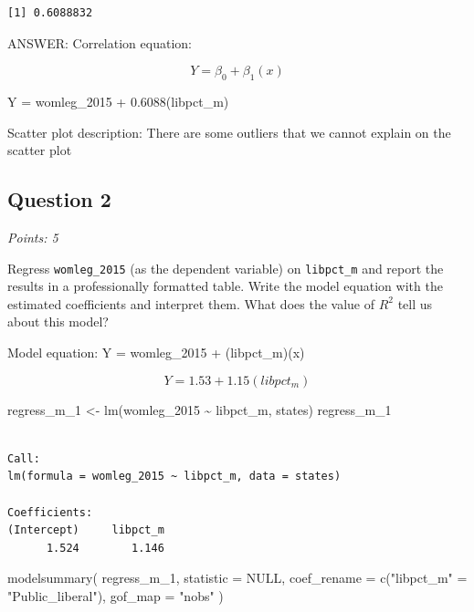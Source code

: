 \documentclass[
  letterpaper,
  DIV=11,
  numbers=noendperiod]{scrartcl}
\newenvironment{Shaded}{\begin{snugshade}}{\end{snugshade}}
\newcommand{\AttributeTok}[1]{\textcolor[rgb]{0.40,0.45,0.13}{#1}}
\newcommand{\ConstantTok}[1]{\textcolor[rgb]{0.56,0.35,0.01}{#1}}
\newcommand{\FunctionTok}[1]{\textcolor[rgb]{0.28,0.35,0.67}{#1}}
\newcommand{\NormalTok}[1]{\textcolor[rgb]{0.00,0.23,0.31}{#1}}
\newcommand{\OtherTok}[1]{\textcolor[rgb]{0.00,0.23,0.31}{#1}}
\newcommand{\SpecialCharTok}[1]{\textcolor[rgb]{0.37,0.37,0.37}{#1}}
\newcommand{\StringTok}[1]{\textcolor[rgb]{0.13,0.47,0.30}{#1}}
\begin{document}
\begin{Shaded}
\end{Shaded}

\begin{verbatim}
[1] 0.6088832
\end{verbatim}

ANSWER: Correlation equation:

\[Y= \beta_0+\beta_1(x)\]

Y = womleg\_2015 + 0.6088(libpct\_m)

Scatter plot description: There are some outliers that we cannot explain
on the scatter plot

\hypertarget{question-2}{%
\subsection{Question 2}\label{question-2}}

\emph{Points: 5}

Regress \texttt{womleg\_2015} (as the dependent variable) on
\texttt{libpct\_m} and report the results in a professionally formatted
table. Write the model equation with the estimated coefficients and
interpret them. What does the value of \(R^2\) tell us about this model?

Model equation: Y = womleg\_2015 + (libpct\_m)(x)

\[Y = 1.53 + 1.15(libpct_m)\]

\begin{Shaded}
\begin{Highlighting}[]
\NormalTok{regress\_m\_1 }\OtherTok{\textless{}{-}} \FunctionTok{lm}\NormalTok{(womleg\_2015 }\SpecialCharTok{\textasciitilde{}}\NormalTok{ libpct\_m, states)}
\NormalTok{regress\_m\_1}
\end{Highlighting}
\end{Shaded}

\begin{verbatim}

Call:
lm(formula = womleg_2015 ~ libpct_m, data = states)

Coefficients:
(Intercept)     libpct_m  
      1.524        1.146  
\end{verbatim}

\begin{Shaded}
\begin{Highlighting}[]
\FunctionTok{modelsummary}\NormalTok{(}
\NormalTok{  regress\_m\_1, }
  \AttributeTok{statistic =} \ConstantTok{NULL}\NormalTok{,}
  \AttributeTok{coef\_rename =} \FunctionTok{c}\NormalTok{(}\StringTok{"libpct\_m"} \OtherTok{=} \StringTok{"Public\_liberal"}\NormalTok{),}
  \AttributeTok{gof\_map =} \StringTok{"nobs"}
\NormalTok{)}
\end{Highlighting}
\end{Shaded}
\end{document}
